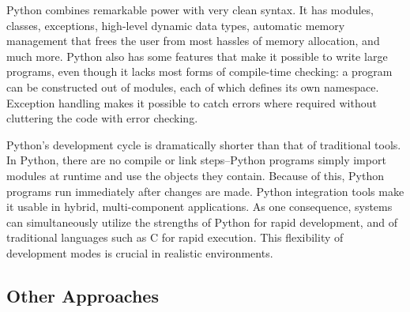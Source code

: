 \documentclass[acmtocl]{acmtrans2m}
\begin{document}
Python combines remarkable power with very clean syntax. It has
modules, classes, exceptions, high-level dynamic data types, automatic
memory management that frees the user from most hassles of memory
allocation, and much more. Python also has some features that make it
possible to write large programs, even though it lacks most forms of
compile-time checking: a program can be constructed out of modules,
each of which defines its own namespace. Exception handling makes it
possible to catch errors where required without cluttering the code
with error checking.

Python's development cycle is dramatically shorter than that of
traditional tools. In Python, there are no compile or link
steps--Python programs simply import modules at runtime and use the
objects they contain. Because of this, Python programs run
immediately after changes are made. Python integration tools make it
usable in hybrid, multi-component applications. As one consequence,
systems can simultaneously utilize the strengths of Python for rapid
development, and of traditional languages such as C for rapid
execution.  This flexibility of development modes is crucial in
realistic environments.

\subsection{Other Approaches}
\end{document}
